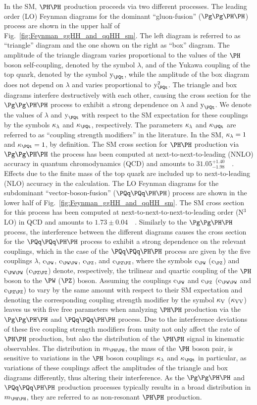 In the SM, $\HH$ production proceeds via two different processes.
The leading order (LO) Feynman diagrams for the dominant ``gluon-fusion'' ($\ggHH$) process are shown in the upper half of Fig.~\ref{fig:Feynman_ggHH_and_qqHH_sm}.
The left diagram is referred to as ``triangle'' diagram and the one shown on the right as ``box'' diagram.
The amplitude of the triangle diagram varies proportional to the values of the $\PHiggs$ boson self-coupling, denoted by the symbol $\lambda$, 
and of the Yukawa coupling of the top quark, denoted by the symbol $\yt$,
while the amplitude of the box diagram does not depend on $\lambda$ and varies proportional to $\yt^{2}$.
The triangle and box diagrams interfere destructively with each other, 
causing the cross section for the $\ggHH$ process to exhibit a strong dependence on $\lambda$ and $\yt$.
We denote the values of $\lambda$ and $\yt$ with respect to the SM expectation for these couplings by the symbols $\kappa_{\lambda}$ and $\kappat$, respectively.
The parameters $\kappa_{\lambda}$ and $\kappat$ are referred to as ``coupling strength modifiers'' in the literature.
In the SM, $\kappa_{\lambda} = 1$ and $\kappat = 1$, by definition.
The SM cross section for $\HH$ production via $\ggHH$ the process has been computed at next-to-next-to-leading (NNLO) accuracy in quantum chromodynamics (QCD)
and amounts to $31.05^{+1.40}_{-1.98}$~\fb~\cite{Grazzini:2018hh}.
Effects due to the finite mass of the top quark are included up to next-to-leading (NLO) accuracy in the calculation.
The LO Feynman diagrams for the subdominant ``vector-boson-fusion'' ($\qqHH$) process are shown in the lower half of Fig.~\ref{fig:Feynman_ggHH_and_qqHH_sm}.
The  SM cross section for this process has been computed at next-to-next-to-next-to-leading order (N$^{3}$LO) in QCD
and amounts to $1.73 \pm 0.04$~\fb~\cite{Dreyer:2018qbw}.
Similarly to the $\ggHH$ process, the interference between the different diagrams causes the cross section for the $\qqHH$ process to exhibit a strong dependence on the relevant couplings,
which in the case of the $\qqHH$ process are given by the five couplings $\lambda$, $\cW$, $\cWW$, $\cZ$, and $\cZZ$,
where the symbols $\cW$ ($\cZ$) and $\cWW$ ($\cZZ$) denote, respectively, the trilinear and quartic coupling of the $\PHiggs$ boson to the $\PW$ ($\PZ$) boson.
Assuming the couplings $\cW$ and $\cZ$ ($\cWW$ and $\cZZ$) to vary by the same amount with respect to their SM expectation 
and denoting the corresponding coupling strength modifier by the symbol $\kappa_{\textrm{V}}$ ($\kappa_{\textrm{V}\textrm{V}}$) leaves us with five free parameters
when analyzing $\HH$ production via the $\ggHH$ and $\qqHH$ process.
Due to the interference deviations of these five coupling strength modifiers from unity not only affect the rate of $\HH$ production,
but also the distribution of the $\HH$ signal in kinematic observables.
The distribution in $\mHH$, the mass of the $\PHiggs$ boson pair, is sensitive to variations in the $\PHiggs$ boson couplings $\kappa_{\lambda}$ and $\kappat$ in particular,
as variations of these couplings affect the amplitudes of the triangle and box diagrams differently, thus altering their interference.
As the $\ggHH$ and $\qqHH$ production processes typically results in a broad distribution in $\mHH$,
they are referred to as non-resonant $\HH$ production.

